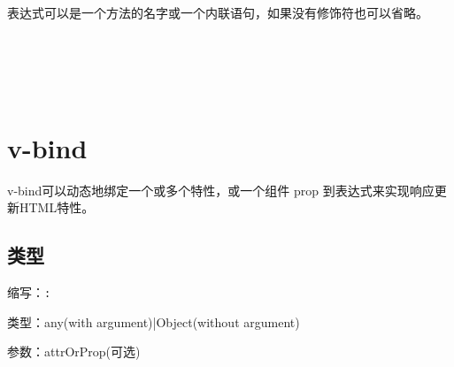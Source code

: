 表达式可以是一个方法的名字或一个内联语句，如果没有修饰符也可以省略。






\begin{lstlisting}[language=JavaScript]

\end{lstlisting}




\begin{lstlisting}[language=JavaScript]

\end{lstlisting}




\begin{lstlisting}[language=JavaScript]

\end{lstlisting}




\begin{lstlisting}[language=JavaScript]

\end{lstlisting}




\begin{lstlisting}[language=JavaScript]

\end{lstlisting}




\begin{lstlisting}[language=JavaScript]

\end{lstlisting}

\section{v-bind}

v-bind可以动态地绑定一个或多个特性，或一个组件 prop 到表达式来实现响应更新HTML特性。


\subsection{类型}

\begin{compactitem}
\item 缩写：\texttt{:}
\item 类型：any(with argument)|Object(without argument)
\item 参数：attrOrProp(可选)
\end{compactitem}



